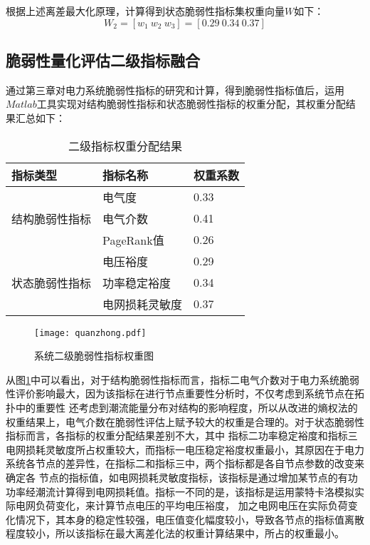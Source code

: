 根据上述离差最大化原理，计算得到状态脆弱性指标集权重向量$W$如下：
\begin{equation}
  \label{equ:chap4:quanzhong2}
    W_2 = \left[w_{1}\ w_{2}\ w_{3}\right]=[0.29\ 0.34\ 0.37]
    \end{equation}


\subsection{脆弱性量化评估二级指标融合}
\label{sec:2ndIndexMerge}

通过第三章对电力系统脆弱性指标的研究和计算，得到脆弱性指标值后，运用$Matlab$工具实现对结构脆弱性指标和状态脆弱性指标的权重分配，其权重分配结果汇总如下：
\begin{table}[htb]
  \centering
  \caption{二级指标权重分配结果}
  \label{tab:quanzhong3}
    \begin{tabular}{C{3.5cm}C{3.5cm}C{3.5cm}}
      \toprule
      指标类型 & 指标名称 & 权重系数 \\
      \midrule
                    & 电气度  &  0.33 \\
      结构脆弱性指标 & 电气介数 & 0.41 \\
                    & PageRank值 & 0.26 \\
                    & 电压裕度  &  0.29 \\
      状态脆弱性指标 & 功率稳定裕度 & 0.34 \\
                    & 电网损耗灵敏度 & 0.37 \\ 
      \bottomrule
    \end{tabular}
\end{table}

\begin{figure}[H] %
  \centering
  \texttt{[image: quanzhong.pdf]}
  \caption{系统二级脆弱性指标权重图}
  \label{fig:quanzhong}
\end{figure}

从图\ref{fig:quanzhong}中可以看出，对于结构脆弱性指标而言，指标二电气介数对于电力系统脆弱性评价影响最大，因为该指标在进行节点重要性分析时，不仅考虑到系统节点在拓扑中的重要性
还考虑到潮流能量分布对结构的影响程度，所以从改进的熵权法的权重结果上，电气介数在脆弱性评估上赋予较大的权重是合理的。对于状态脆弱性指标而言，各指标的权重分配结果差别不大，其中
指标二功率稳定裕度和指标三电网损耗灵敏度所占权重较大，而指标一电压稳定裕度权重最小，其原因在于电力系统各节点的差异性，在指标二和指标三中，两个指标都是各自节点参数的改变来确定各
节点的指标值，如电网损耗灵敏度指标，该指标是通过增加某节点的有功功率经潮流计算得到电网损耗值。指标一不同的是，该指标是运用蒙特卡洛模拟实际电网负荷变化，来计算节点电压的平均电压裕度，
加之电网电压在实际负荷变化情况下，其本身的稳定性较强，电压值变化幅度较小，导致各节点的指标值离散程度较小，所以该指标在最大离差化法的权重计算结果中，所占的权重最小。

